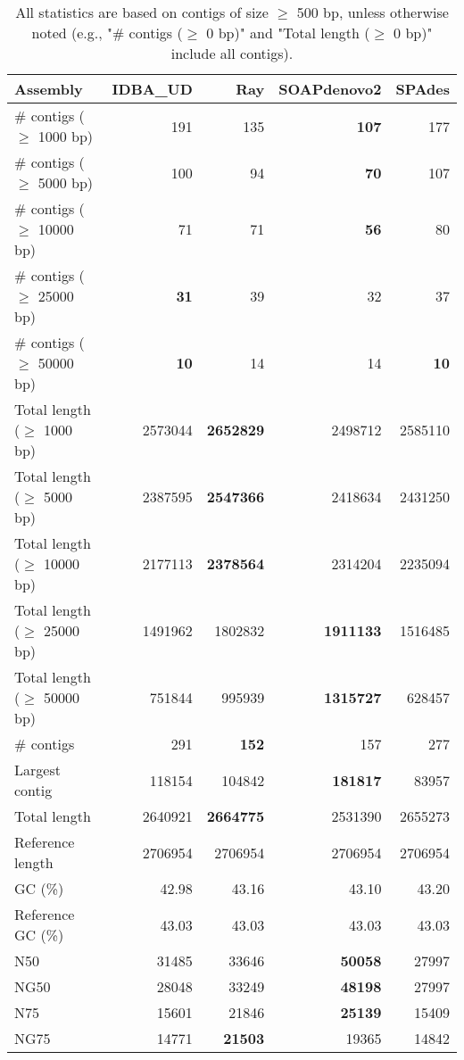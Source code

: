 \documentclass[12pt,a4paper]{article}
\begin{document}
\begin{table}[ht]
\begin{center}
\caption{All statistics are based on contigs of size $\geq$ 500 bp, unless otherwise noted (e.g., "\# contigs ($\geq$ 0 bp)" and "Total length ($\geq$ 0 bp)" include all contigs).}
\begin{tabular}{|l*{4}{|r}|}
\hline
Assembly & IDBA\_UD & Ray & SOAPdenovo2 & SPAdes \\ \hline
\# contigs ($\geq$ 1000 bp) & 191 & 135 & {\bf 107} & 177 \\ \hline
\# contigs ($\geq$ 5000 bp) & 100 & 94 & {\bf 70} & 107 \\ \hline
\# contigs ($\geq$ 10000 bp) & 71 & 71 & {\bf 56} & 80 \\ \hline
\# contigs ($\geq$ 25000 bp) & {\bf 31} & 39 & 32 & 37 \\ \hline
\# contigs ($\geq$ 50000 bp) & {\bf 10} & 14 & 14 & {\bf 10} \\ \hline
Total length ($\geq$ 1000 bp) & 2573044 & {\bf 2652829} & 2498712 & 2585110 \\ \hline
Total length ($\geq$ 5000 bp) & 2387595 & {\bf 2547366} & 2418634 & 2431250 \\ \hline
Total length ($\geq$ 10000 bp) & 2177113 & {\bf 2378564} & 2314204 & 2235094 \\ \hline
Total length ($\geq$ 25000 bp) & 1491962 & 1802832 & {\bf 1911133} & 1516485 \\ \hline
Total length ($\geq$ 50000 bp) & 751844 & 995939 & {\bf 1315727} & 628457 \\ \hline
\# contigs & 291 & {\bf 152} & 157 & 277 \\ \hline
Largest contig & 118154 & 104842 & {\bf 181817} & 83957 \\ \hline
Total length & 2640921 & {\bf 2664775} & 2531390 & 2655273 \\ \hline
Reference length & 2706954 & 2706954 & 2706954 & 2706954 \\ \hline
GC (\%) & 42.98 & 43.16 & 43.10 & 43.20 \\ \hline
Reference GC (\%) & 43.03 & 43.03 & 43.03 & 43.03 \\ \hline
N50 & 31485 & 33646 & {\bf 50058} & 27997 \\ \hline
NG50 & 28048 & 33249 & {\bf 48198} & 27997 \\ \hline
N75 & 15601 & 21846 & {\bf 25139} & 15409 \\ \hline
NG75 & 14771 & {\bf 21503} & 19365 & 14842 \\ \hline

\end{tabular}
\end{center}
\end{table}
\end{document}
